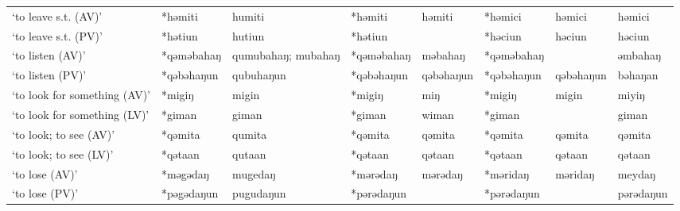 \begin{landscape}
\begin{longtable}[c]{@{}p{3cm}<{\raggedright}p{2.75cm}<{\raggedright}p{2.75cm}<{\raggedright}p{2.75cm}<{\raggedright}p{2.75cm}<{\raggedright}p{2.75cm}<{\raggedright}p{2.75cm}<{\raggedright}p{2.75cm}<{\raggedright}@{}}
`to leave s.t. (AV)'                                 & *həmiti            & humiti                         & *həmiti            & həmiti                     & *həmici          & həmici                   & həmici                            \\
`to leave s.t. (PV)'                                 & *hətiun            & hutiun                         & *hətiun            &                            & *həciun          & həciun                   & həciun                            \\
`to listen (AV)'                                     & *qəməbahaŋ         & qumubahaŋ; mubahaŋ             & *qəməbahaŋ         & məbahaŋ                    & *qəməbahaŋ       &                          & əmbahaŋ                           \\
`to listen (PV)'                                     & *qəbəhaŋun         & qubuhaŋun                      & *qəbəhaŋun         & qəbəhaŋun                  & *qəbəhaŋun       & qəbəhaŋun                & bəhaŋan                           \\
`to look for something (AV)'                         & *migiŋ             & migin                          & *migiŋ             & miŋ                        & *migiŋ           & migin                    & miyiŋ                             \\
`to look for something (LV)'                         & *giman             & giman                          & *giman             & wiman                      & *giman           &                          & giman                             \\
`to look; to see (AV)'                               & *qəmita            & qumita                         & *qəmita            & qəmita                     & *qəmita          & qəmita                   & qəmita                            \\
`to look; to see (LV)'                               & *qətaan            & qutaan                         & *qətaan            & qətaan                     & *qətaan          & qətaan                   & qətaan                            \\
`to lose (AV)'                                       & *məgədaŋ           & mugedaŋ                        & *mərədaŋ           & mərədaŋ                    & *məridaŋ         & məridaŋ                  & meydaŋ                            \\
`to lose (PV)'                                       & *pəgədaŋun         & pugudaŋun                      & *pərədaŋun         &                            & *pərədaŋun       &                          & pərədaŋun                         \\

\end{longtable}
\end{landscape}
